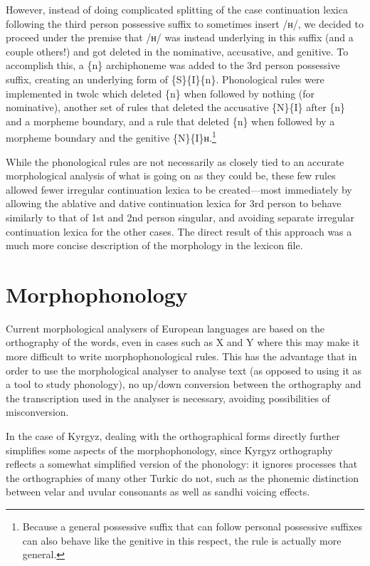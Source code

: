 \documentclass[10pt,a4paper,twocolumn]{article}
\begin{document}
However, instead of doing complicated splitting of the case continuation lexica following the third person possessive suffix to sometimes insert /н/, we decided to proceed under the premise that /н/ was instead underlying in this suffix (and a couple others!) and got deleted in the nominative, accusative, and genitive.  To accomplish this, a \{n\} archiphoneme was added to the 3rd person possessive suffix, creating an underlying form of \{S\}\{I\}\{n\}.  Phonological rules were implemented in twolc which deleted \{n\} when followed by nothing (for nominative), another set of rules that deleted the accusative \{N\}\{I\} after \{n\} and a morpheme boundary, and a rule that deleted \{n\} when followed by a morpheme boundary and the genitive \{N\}\{I\}н.\footnote{Because a general possessive suffix that can follow personal possessive suffixes can also behave like the genitive in this respect, the rule is actually more general.}

While the phonological rules are not necessarily as closely tied to an accurate morphological analysis of what is going on as they could be, these few rules allowed fewer irregular continuation lexica to be created---most immediately by allowing the ablative and dative continuation lexica for 3rd person to behave similarly to that of 1st and 2nd person singular, and avoiding separate irregular continuation lexica for the other cases.  The direct result of this approach was a much more concise description of the morphology in the lexicon file.

\section{Morphophonology}

Current morphological analysers of European languages are based on the orthography of the words, even in cases such as X and Y where this may make it more difficult to write morphophonological rules.  This has the advantage that in order to use the morphological analyser to analyse text (as opposed to using it as a tool to study phonology), no up/down conversion between the orthography and the transcription used in the analyser is necessary, avoiding possibilities of misconversion.

In the case of Kyrgyz, dealing with the orthographical forms directly further simplifies some aspects of the morphophonology, since Kyrgyz orthography reflects a somewhat simplified version of the phonology: it ignores processes that the orthographies of many other Turkic do not, such as the phonemic distinction between velar and uvular consonants as well as sandhi voicing effects.
\end{document}
